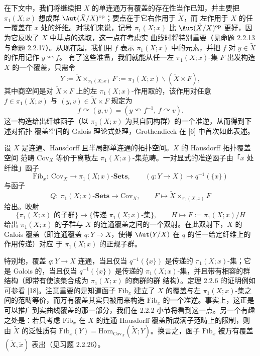 在下文中，我们将继续把 $X$ 的单连通万有覆盖的存在性当作已知，并主要把
$\pi_1(X;x)$ 想成群 $\Aut(\tilde X/X)^{\mathrm{op}}$；要点在于它右作用于 $\tilde X$，而
左作用于 $X$ 的任一覆盖在 $x$ 处的纤维。对我们来说，记号 $\pi_1(X;x)$ 比
$\Aut(\tilde X/X)^{\mathrm{op}}$ 更好，因为它反映了 $X$ 中基点的选取，这一点在考虑实
曲线时将特别重要（见命题 2.2.13 与命题 2.2.17）。从现在起，我们用 $f$ 表示
$\pi_1(X;x)$ 中的元素，并把 $f$ 对 $y\in\tilde X$ 的作用记作 $y\curvearrowleft f$。
有了这些准备，我们就能从任一左 $\pi_1(X;x)$-集 $F$ 出发构造 $X$ 的一个覆盖，只需令
\[
Y:=\tilde X\times_{\pi_1(X;x)}F:=\pi_1(X;x)\backslash(\tilde X\times F),
\]
其中商空间是对 $\tilde X\times F$ 上的左 $\pi_1(X;x)$-作用取的，该作用对任意
$f\in\pi_1(X;x)$ 与 $(y,v)\in\tilde X\times F$ 规定为
\[
f\curvearrowright(y,v)=(y\curvearrowleft f^{-1},\,f\curvearrowright v).
\]
这一构造给出纤维函子（以 $\pi_1(X;x)$ 为其自同构群）的一个准逆，从而得到下述对拓扑
覆盖空间的 Galois 理论式处理，Grothendieck 在 [6] 中首次如此表述。

\begin{theorem}\label{thm:2.2.6}
设 $X$ 是连通、Hausdorff 且半局部单连通的拓扑空间。$X$ 的 Hausdorff 拓扑覆盖空间
范畴 $\mathrm{Cov}_X$ 等价于离散左 $\pi_1(X;x)$-集范畴。一对显式的准逆函子由「$x$ 处
纤维」函子
\[
\mathrm{Fib}_x:\ \mathrm{Cov}_X\longrightarrow\pi_1(X;x)\text{-}\mathbf{Sets},
\qquad (q:Y\to X)\longmapsto q^{-1}(\{x\})
\]
与函子
\[
Q:\ \pi_1(X;x)\text{-}\mathbf{Sets}\longrightarrow\mathrm{Cov}_X,
\qquad F\longmapsto\tilde X\times_{\pi_1(X;x)}F
\]
给出。映射
\[
\{\pi_1(X;x)\text{ 的子群}\}\longrightarrow\{\text{传递 }\pi_1(X;x)\text{-集}\},
\qquad H\longmapsto F:=\pi_1(X;x)/H
\]
给出 $\pi_1(X;x)$ 的子群与 $X$ 的连通覆盖之间的一个双射。在此双射下，$X$ 的 Galois
覆盖（即连通覆盖 $q:Y\to X$，使得 $\Aut(Y/X)$ 在 $q$ 的任一给定纤维上的作用传递）对应
于 $\pi_1(X;x)$ 的正规子群。
\end{theorem}

特别地，覆盖 $q:Y\to X$ 连通，当且仅当 $q^{-1}(\{x\})$ 是传递的
$\pi_1(X;x)$-集；它是 Galois 的，当且仅当 $q^{-1}(\{x\})$ 是传递的
$\pi_1(X;x)$-集，并且带有相容的群结构（即带有使该集合成为 $\pi_1(X;x)$ 的商群的群
结构）。定理 2.2.6 的证明例如可参看 [18]。注意重要的是知道函子 $\mathrm{Fib}_x$ 建立了
$X$ 的覆盖与左 $\pi_1(X;x)$-集之间的范畴等价，而万有覆盖其实只被用来构造
$\mathrm{Fib}_x$ 的一个准逆。事实上，这正是可以推广到实曲线覆盖的那一部分，我们在
2.2.2 小节将看到这一点。另一个有趣之处是：若只考虑 $\mathrm{Fib}_x$ 在 $X$ 的连通
Hausdorff 覆盖所成满子范畴上的限制，则由 $\tilde X$ 的泛性质有
$\mathrm{Fib}_x(Y)=\mathrm{Hom}_{\mathrm{Cov}_X}(\tilde X;Y)$。换言之，函子
$\mathrm{Fib}_x$ 被万有覆盖 $(\tilde X,\tilde x)$ 表出（见习题 2.2.26）。

